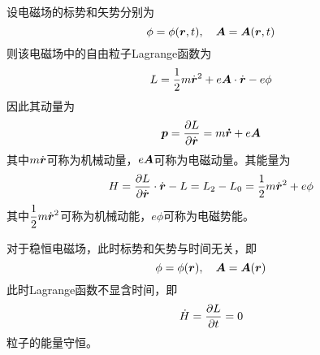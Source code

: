 \begin{example}
设电磁场的标势和矢势分别为
\begin{equation*}
	\phi = \phi(\boldsymbol{r},t),\quad \boldsymbol{A} = \boldsymbol{A}(\boldsymbol{r},t)
\end{equation*}
则该电磁场中的自由粒子Lagrange函数为
\begin{equation}
	L = \frac12 m\dot{\boldsymbol{r}}^2 + e \boldsymbol{A} \cdot \dot{\boldsymbol{r}} - e\phi
\end{equation}
因此其动量为
\begin{equation}
	\boldsymbol{p} = \frac{\partial L}{\partial \dot{\boldsymbol{r}}} = m\boldsymbol{\dot{r}} + e\boldsymbol{A}
\end{equation}
其中$m\dot{\boldsymbol{r}}$可称为{\heiti 机械动量}，$e\boldsymbol{A}$可称为{\heiti 电磁动量}。其能量为
\begin{equation}
	H = \frac{\partial L}{\partial \dot{\boldsymbol{r}}} \cdot \dot{\boldsymbol{r}} - L = L_2 - L_0 = \frac12 m\dot{\boldsymbol{r}}^2 + e\phi
\end{equation}
其中$\dfrac12 m\dot{\boldsymbol{r}}^2$可称为{\heiti 机械动能}，$e\phi$可称为{\heiti 电磁势能}。

\iffalse
对于均匀电磁场，此时标势和矢势与空间坐标无关\footnote{这里均匀电磁场并非指场变量$\mbf{E}$和$\mbf{B}$而是指标势和矢势在空间上是均匀的。如果场变量在空间上均匀，标势和矢势并不一定与空间坐标无关。此时有\begin{equation*} \mbf{E} = -\bnb \phi - \frac{\pl \mbf{A}}{\pl t} = - \frac{\pl \mbf{A}}{\pl t},\quad \mbf{B} = \bnb \times \mbf{A} = \mbf{0} \end{equation*}即空间中只存在均匀的时变电场，这可由场源的特定分布来实现。}，即
\begin{equation*}
	\phi = \phi(t),\quad \mbf{A} = \mbf{A}(t)
\end{equation*}
此时$\mbf{r}$为循环坐标，因此有
\begin{equation*}
	\dot{\mbf{p}} = \frac{\pl L}{\pl \mbf{r}} = \mbf{0}
\end{equation*}
粒子的动量守恒。\fi

对于稳恒电磁场，此时标势和矢势与时间无关，即
\begin{equation*}
	\phi = \phi(\boldsymbol{r}),\quad \boldsymbol{A} = \boldsymbol{A}(\boldsymbol{r})
\end{equation*}
此时Lagrange函数不显含时间，即
\begin{equation*}
	\dot{H} = \frac{\partial L}{\partial t} = 0
\end{equation*}
粒子的能量守恒。
\end{example}

